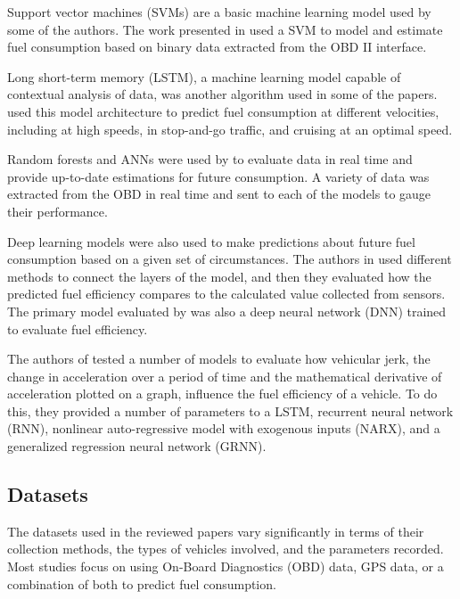 \documentclass[letterpaper]{article}
\begin{document}
Support vector machines (SVMs) are a basic machine learning model used by some of the authors. 
The work presented in \cite{abukhalil2020fuel} used a SVM to model and estimate fuel 
consumption based on binary data extracted from the OBD II interface. 

Long short-term memory (LSTM), a machine learning model capable of contextual analysis of data, 
was another algorithm used in some of the papers. \cite{wang2020fuelnet} used this
model architecture to predict fuel consumption at different velocities,
including at high speeds, in stop-and-go traffic, and cruising at an optimal
speed. 

Random forests and ANNs were used by \cite{abediasl2024real} to
evaluate data in real time and provide up-to-date estimations for future
consumption. A variety of data was extracted from the OBD in real time and sent
to each of the models to gauge their performance. 

Deep learning models were also used to make predictions about future fuel consumption 
based on a given set of circumstances. The authors in \cite{yen_combining_2021} used 
different methods to connect the layers of the model, and then they evaluated how the 
predicted fuel efficiency compares to the calculated value collected from sensors. The
primary model evaluated by \cite{topic2022neural} was also a deep neural
network (DNN) trained to evaluate fuel efficiency. 

The authors of \cite{zhang2023novel} tested a number of models to evaluate how vehicular 
jerk, the change in acceleration over a period of time and the mathematical derivative of 
acceleration plotted on a graph, influence the fuel efficiency of a vehicle. To do this, 
they provided a number of parameters to a LSTM, recurrent neural network (RNN), nonlinear 
auto-regressive model with exogenous inputs (NARX), and a generalized regression neural 
network (GRNN).


\subsection*{Datasets}

The datasets used in the reviewed papers vary significantly in terms of their
collection methods, the types of vehicles involved, and the parameters recorded.
Most studies focus on using On-Board Diagnostics (OBD) data, GPS data, or a
combination of both to predict fuel consumption. 
\end{document}
